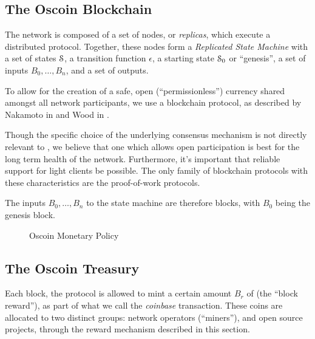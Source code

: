 \subsection{The Oscoin Blockchain}


The \oscoin{} network is composed of a set of nodes, or \emph{replicas}, which
execute a distributed protocol. Together, these nodes form a \emph{Replicated
  State Machine} with a set of states $\mathcal{S}$, a transition function $\epsilon$,
a starting state $\mathcal{S}_0$ or ``genesis'', a set of inputs $B_0, \ldots, B_n$,
and a set of outputs.

To allow for the creation of a safe, open (``permissionless'') currency shared
amongst all network participants, we use a blockchain protocol, as described by
Nakamoto in \cite{bitcoin} and Wood in \cite{ethereum}.

Though the specific choice of the underlying consensus mechanism is not
directly relevant to \oscoin{}, we believe that one which allows open
participation is best for the long term health of the network. Furthermore,
it's important that reliable support for light clients be possible. The only
family of blockchain protocols with these characteristics are the proof-of-work
protocols.

The inputs $B_0, \ldots, B_n$ to the state machine are therefore blocks, with
$B_0$ being the genesis block.


\begin{figure*}[!ht]
    \par\medskip\noindent\minipage{\linewidth}
    \centering
    
    \caption{Oscoin Monetary Policy\label{f:oscoin}}
    \endminipage\par\medskip
\end{figure*}

\subsection{The Oscoin Treasury}

Each block, the protocol is allowed to mint a certain amount $B_r$ of \oscoin{}
(the ``block reward''), as part of what we call the \emph{coinbase}
transaction. These coins are allocated to two distinct groups: network operators (``miners''), and open source projects, through the reward mechanism described in
this section.

